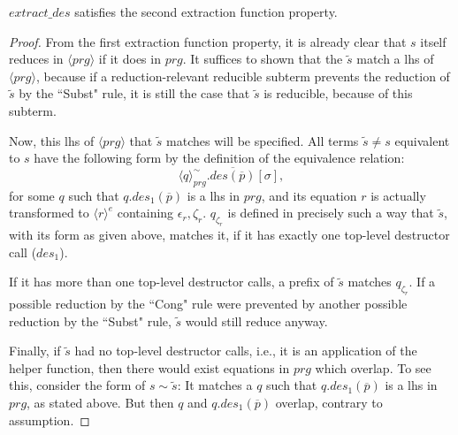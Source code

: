 \begin{lemma}

$extract\_des$ satisfies the second extraction function property.

\begin{proof}

From the first extraction function property, it is already clear that $s$ itself reduces in $\langle prg \rangle$ if it does in $prg$. It suffices to shown that the $\widetilde{s}$ match a lhs of $\langle prg \rangle$, because if a reduction-relevant reducible subterm prevents the reduction of $\widetilde{s}$ by the ``Subst" rule, it is still the case that $\widetilde{s}$ is reducible, because of this subterm.

Now, this lhs of $\langle prg \rangle$ that $\widetilde{s}$ matches will be specified. All terms $\widetilde{s} \neq s$ equivalent to $s$ have the following form by the definition of the equivalence relation:
\begin{equation*}
\langle q \rangle^{\sim}_{prg}.\overline{des(\overline{p})}[\sigma],
\end{equation*}
for some $q$ such that $q.des_1(\overline{p})$ is a lhs in $prg$, and its equation $r$ is actually transformed to $\langle r \rangle^e$ containing $\epsilon_r, \zeta_r$. $q_{\zeta_r}$ is defined in precisely such a way that $\widetilde{s}$, with its form as given above, matches it, if it has exactly one top-level destructor call ($des_1$).

If it has more than one top-level destructor calls, a prefix of $\widetilde{s}$ matches $q_{\zeta_r}$. If a  possible reduction by the ``Cong" rule were prevented by another possible reduction by the ``Subst" rule, $\widetilde{s}$ would still reduce anyway.

Finally, if $\widetilde{s}$ had no top-level destructor calls, i.e., it is an application of the helper function, then there would exist equations in $prg$ which overlap. To see this, consider the form of $s \sim \widetilde{s}$: It matches a $q$ such that $q.des_1(\overline{p})$ is a lhs in $prg$, as stated above. But then $q$ and $q.des_1(\overline{p})$ overlap, contrary to assumption.

\end{proof}

\end{lemma}

